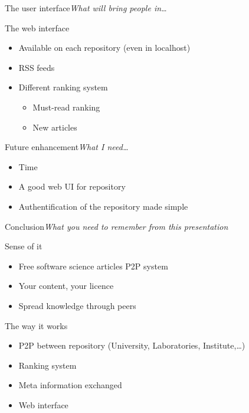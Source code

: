 \begin{frame}{The user interface}{\textit{What will bring people in\ldots}}

\begin{block}{The web interface}
\begin{itemize}
\item Available on each repository (even in localhost)
\item RSS feeds
\item Different ranking system
\begin{itemize}
\item Must-read ranking
\item New articles
\end{itemize}
\end{itemize}
\end{block}

\end{frame}


\begin{frame}{Future enhancement}{\textit{What I need\ldots}}

\begin{itemize}
\item Time
\item A good web UI for repository
\item Authentification of the repository made simple
\end{itemize}

\end{frame}



\begin{frame}{Conclusion}{\textit{What you need to remember from this presentation}}

\begin{block}{Sense of it}
\begin{itemize}
\item Free software science articles P2P system
\item Your content, your licence
\item Spread knowledge through peers
\end{itemize}
\end{block}

\begin{block}{The way it works}
\begin{itemize}
\item P2P between repository (University, Laboratories, Institute,\ldots)
\item Ranking system
\item Meta information exchanged
\item Web interface
\end{itemize}
\end{block}


\end{frame}


